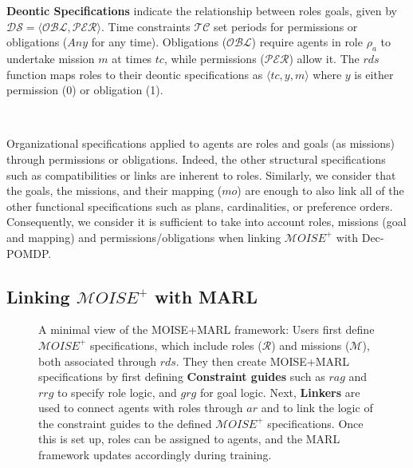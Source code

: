 \documentclass[pdflatex,sn-mathphys-num]{sn-jnl}%
\theoremstyle{thmstyleone}%
\theoremstyle{thmstyletwo}%
\theoremstyle{thmstylethree}%
\begin{document}
\noindent \textbf{Deontic Specifications} indicate the relationship between roles goals, given by $\mathcal{DS} = \langle \mathcal{OBL}, \mathcal{PER} \rangle$. Time constraints $\mathcal{TC}$ set periods for permissions or obligations ($Any$ for any time). Obligations ($\mathcal{OBL}$) require agents in role $\rho_a$ to undertake mission $m$ at times $tc$, while permissions ($\mathcal{PER}$) allow it. The $rds$ function maps roles to their deontic specifications as $\langle tc, y, m \rangle$ where $y$ is either permission (0) or obligation (1).

\

\noindent Organizational specifications applied to agents are roles and goals (as missions) through permissions or obligations. Indeed, the other structural specifications such as compatibilities or links are inherent to roles. Similarly, we consider that the goals, the missions, and their mapping ($mo$) are enough to also link all of the other functional specifications such as plans, cardinalities, or preference orders.
Consequently, we consider it is sufficient to take into account roles, missions (goal and mapping) and permissions/obligations when linking $\mathcal{M}OISE^+$ with Dec-POMDP. 

\subsection{Linking $\mathcal{M}OISE^+$ with MARL}

\begin{figure}[h!]
    \centering
    
    \caption{A minimal view of the MOISE+MARL framework:
        Users first define $\mathcal{M}OISE^+$ specifications, which include roles ($\mathcal{R}$) and missions ($\mathcal{M}$), both associated through $rds$. They then create MOISE+MARL specifications by first defining \textbf{Constraint guides} such as $rag$ and $rrg$ to specify role logic, and $grg$ for goal logic. 
        Next, \textbf{Linkers} are used to connect agents with roles through $ar$ and to link the logic of the constraint guides to the defined $\mathcal{M}OISE^+$ specifications. Once this is set up, roles can be assigned to agents, and the MARL framework updates accordingly during training.
    }
    \label{fig:mm_synthesis}
\end{figure}

\
\end{document}
